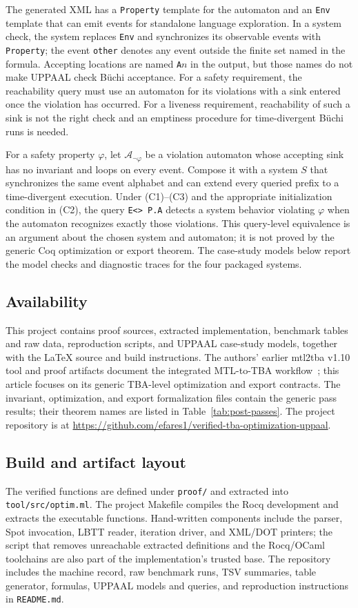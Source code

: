 \documentclass{ieeeaccess}
\begin{document}
The generated XML has a \texttt{Property} template for the automaton and an
\texttt{Env} template that can emit events for standalone language
exploration. In a system check, the system replaces \texttt{Env} and
synchronizes its observable events with \texttt{Property}; the event
\texttt{other} denotes any event outside the finite set named in the formula.
Accepting locations are named \texttt{A}$n$ in the output, but those names do
not make UPPAAL check B\"uchi acceptance. For a safety requirement, the
reachability query must use an automaton for its violations with a sink entered
once the violation has occurred. For a liveness requirement, reachability of
such a sink is not the right check and an emptiness procedure for
time-divergent B\"uchi runs is needed.

For a safety property $\varphi$, let $\mathcal A_{\neg\varphi}$ be a
violation automaton whose accepting sink has no invariant and loops on every
event. Compose it with a system $S$ that synchronizes the same event alphabet
and can extend every queried prefix to a time-divergent execution. Under
(C1)--(C3) and the appropriate initialization condition in (C2), the query
\texttt{E<> P.A} detects a system behavior violating $\varphi$ when the
automaton recognizes exactly those violations. This query-level equivalence
is an argument about the chosen system and automaton; it is not proved by the
generic Coq optimization or export theorem. The case-study models below
report the model checks and diagnostic traces for the four packaged systems.

\subsection{Availability}
This project contains proof sources, extracted implementation, benchmark tables and raw data, reproduction scripts, and UPPAAL case-study models, together with the LaTeX source and build instructions. The authors' earlier mtl2tba v1.10 tool and proof artifacts document the integrated MTL-to-TBA workflow~\cite{mtl2b_tool,mtl2b_proof}; this article focuses on its generic TBA-level optimization and export contracts. The invariant, optimization, and export formalization files contain the generic pass results; their theorem names are listed in Table~\ref{tab:post-passes}. The project repository is at \url{https://github.com/efares1/verified-tba-optimization-uppaal}.

\subsection{Build and artifact layout}
The verified functions are defined under \texttt{proof/} and extracted into
\texttt{tool/src/optim.ml}. The project Makefile compiles the Rocq
development and extracts the executable functions. Hand-written components
include the parser, Spot invocation, LBTT reader, iteration driver, and
XML/DOT printers; the script that removes unreachable extracted definitions
and the Rocq/OCaml toolchains are also part of the implementation's trusted
base. The repository includes the machine record, raw benchmark runs, TSV
summaries, table generator, formulas, UPPAAL models and queries, and
reproduction instructions in \texttt{README.md}.
\end{document}

